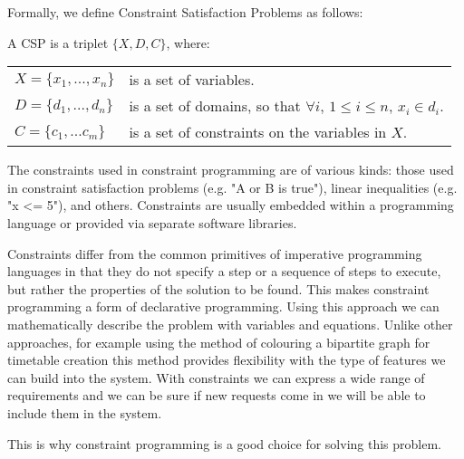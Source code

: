 Formally, we define Constraint Satisfaction Problems as follows:

A CSP is a triplet $\{X,D,C\}$, where:

\begin{center}
\begin{tabular}{ll}
$X=\{x_1, ..., x_n\}$ & is a set of variables.\\
$D=\{d_1, ..., d_n\}$ & is a set of domains, so that $\forall{}i$, $1\leq{}i\leq{}n$, $x_i \in{} d_i$.\\
$C=\{c_1, ... c_m\}$  & is a set of constraints on the variables in $X$.\\
\end{tabular}
\end{center}

The constraints used in constraint programming are of various kinds: those used in constraint satisfaction problems (e.g. "A or B is true"), linear inequalities (e.g. "x <= 5"), and others. Constraints are usually embedded within a programming language or provided via separate software libraries.

Constraints differ from the common primitives of imperative programming languages in that they do not specify a step or a sequence of steps to execute, but rather the properties of the solution to be found. This makes constraint programming a form of declarative programming. Using this approach we can mathematically describe the problem with variables and equations. Unlike other approaches, for example using the method of colouring a bipartite graph for timetable creation this method provides flexibility with the type of features we can build into the system. With constraints we can express a wide range of requirements and we can be sure if new requests come in we will be able to include them in the system.

This is why constraint programming is a good choice for solving this problem.


